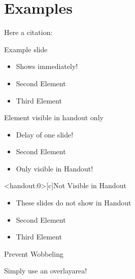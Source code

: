 \section{Examples}

\begin{frame}[c]
     Here a citation: \cite{benchcpp}
\end{frame}




\begin{frame}[c]{Example slide}
    \Large
    \begin{itemize}[<+->]
        \item Shows immediately!
        \item Second Element
        \item Third Element
    \end{itemize}
\end{frame}


\begin{frame}[c]{Element visible in handout only}
    \Large
    \begin{itemize}[<+(1)->]
        \item Delay of one slide!
        \item Second Element
        \item<handout> Only visible in Handout!
    \end{itemize}
\end{frame}


\begin{frame}<handout:0>[c]{Not Visible in Handout}
    \Large
    \begin{itemize}[<+(1)->]
        \item These slides do not show in Handout
        \item Second Element
        \item Third Element
    \end{itemize}
\end{frame}


\begin{frame}[c]{Prevent Wobbeling}

    Simply use an overlayarea!


\end{frame}




